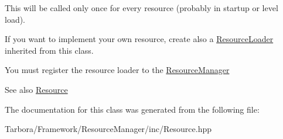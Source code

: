 This will be called only once for every resource (probably in startup or level load).

If you want to implement your own resource, create also a \hyperlink{classTarbora_1_1ResourceLoader}{Resource\+Loader} inherited from this class.

You must register the resource loader to the \hyperlink{classTarbora_1_1ResourceManager}{Resource\+Manager}

\begin{DoxySeeAlso}{See also}
\hyperlink{classTarbora_1_1Resource}{Resource} 
\end{DoxySeeAlso}


The documentation for this class was generated from the following file\+:\begin{DoxyCompactItemize}
\item 
Tarbora/\+Framework/\+Resource\+Manager/inc/Resource.\+hpp\end{DoxyCompactItemize}
